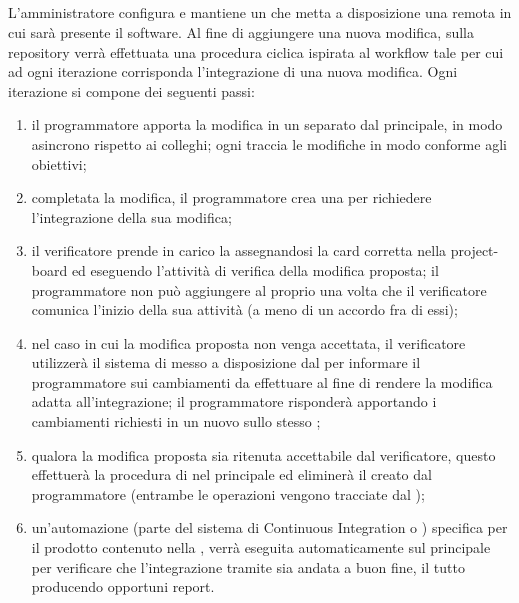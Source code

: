             \subparagraph{}
            L'amministratore configura e mantiene un  che metta a disposizione una  remota in cui sarà presente il software. Al fine di aggiungere una nuova modifica, sulla repository verrà effettuata una procedura ciclica ispirata al workflow  tale per cui ad ogni iterazione corrisponda l'integrazione di una nuova modifica. Ogni iterazione si compone dei seguenti passi:
            \begin{enumerate}
                \item il programmatore apporta la modifica in un  separato dal  principale, in modo asincrono rispetto ai colleghi; ogni  traccia le modifiche in modo conforme agli obiettivi;
                \item completata la modifica, il programmatore crea una  per richiedere l'integrazione della sua modifica;
                \item il verificatore prende in carico la  assegnandosi la card corretta nella project-board ed eseguendo l'attività di verifica della modifica proposta; il programmatore non può aggiungere  al proprio  una volta che il verificatore comunica l'inizio della sua attività (a meno di un accordo fra di essi);
                \item nel caso in cui la modifica proposta non venga accettata, il verificatore utilizzerà il sistema di  messo a disposizione dal  per informare il programmatore sui cambiamenti da effettuare al fine di rendere la modifica adatta all'integrazione; il programmatore risponderà apportando i cambiamenti richiesti in un nuovo  sullo stesso ;
                \item qualora la modifica proposta sia ritenuta accettabile dal verificatore, questo effettuerà la procedura di  nel  principale ed eliminerà il  creato dal programmatore (entrambe le operazioni vengono tracciate dal );
                \item un'automazione (parte del sistema di Continuous Integration o ) specifica per il prodotto contenuto nella , verrà eseguita automaticamente sul  principale per verificare che l'integrazione tramite  sia andata a buon fine, il tutto producendo opportuni report.
            \end{enumerate}
        
